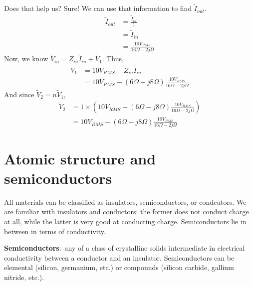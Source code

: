 \documentclass[nobib]{tufte-handout}
\newcommand{\defn}[2]{\noindent\textbf{#1}:\ #2}
\begin{document}
Does that help us? Sure! We can use that information to find 
$\tilde{I}_{out}$. 
\begin{align*}
    \tilde{I}_{out} &= \frac{\tilde{I}_{in}}{1} \\
    &= \tilde{I}_{in} \\
    &= \frac{10 V_{RMS}}{16\Omega - 2j\Omega}
\end{align*}
Now, we know $\tilde{V}_{in} = Z_{in}\tilde{I}_{in} + \tilde{V}_1$. 
Thus, 
\begin{align*}
    \tilde{V}_1 &= 10V_{RMS} - Z_{in}\tilde{I}_{in} \\
    &= 10V_{RMS} - (6\Omega-j8\Omega) \frac{10 V_{RMS}}{16\Omega - 2j\Omega}
\end{align*}
And since $\tilde{V}_2 = n\tilde{V}_1$, 
\begin{align*}
    \tilde{V}_2 &= 1 \times \left(10V_{RMS} - (6\Omega-j8\Omega) \frac{10 V_{RMS}}{16\Omega - 2j\Omega}\right)\\
    &= 10V_{RMS} - (6\Omega-j8\Omega) \frac{10 V_{RMS}}{16\Omega - 2j\Omega}
\end{align*}
\section{Atomic structure and semiconductors}
All materials can be classified as insulators, semiconductors, 
or condcutors. We are familiar with insulators and conductors: 
the former does not conduct charge at all, while the latter 
is very good at conducting charge. Semiconductors lie in between 
in terms of conductivity. 

\defn{Semiconductors}{any of a class of crystalline 
solids intermediate in electrical conductivity 
between a conductor and an insulator}. 
Semiconductors can be elemental (silicon, germanium, etc.) or 
compounds (silicon carbide, gallium nitride, etc.). 
\end{document}
